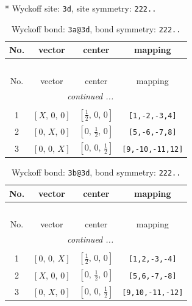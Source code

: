 \documentclass[fleqn,8pt]{jsarticle}
\begin{document}
* Wyckoff site: {\tt 3d}, site symmetry: {\tt 222..}
\renewcommand{\arraystretch}{1.2}
\begin{longtable}{cccc}
\caption{Wyckoff bond: {\tt 3a@3d}, bond symmetry: {\tt 222..}}
 \\
 \hline \hline
No. & vector & center & mapping \\ \hline \endfirsthead

\multicolumn{3}{l}{\tablename\ \thetable{}} \\
 \hline \hline
No. & vector & center & mapping \\ \hline \endhead

 \hline \hline
\multicolumn{3}{r}{\footnotesize\it continued ...} \\ \endfoot

 \hline \hline
\multicolumn{3}{r}{} \\ \endlastfoot

1 & $\left[ X,\, 0,\, 0 \right]$ & $\left[ \frac{1}{2},\, 0,\, 0 \right]$ & {\tt [1,-2,-3,4]} \\ \hline
2 & $\left[ 0,\, X,\, 0 \right]$ & $\left[ 0,\, \frac{1}{2},\, 0 \right]$ & {\tt [5,-6,-7,8]} \\ \hline
3 & $\left[ 0,\, 0,\, X \right]$ & $\left[ 0,\, 0,\, \frac{1}{2} \right]$ & {\tt [9,-10,-11,12]} \\
\end{longtable}
\renewcommand{\arraystretch}{1.2}
\begin{longtable}{cccc}
\caption{Wyckoff bond: {\tt 3b@3d}, bond symmetry: {\tt 222..}}
 \\
 \hline \hline
No. & vector & center & mapping \\ \hline \endfirsthead

\multicolumn{3}{l}{\tablename\ \thetable{}} \\
 \hline \hline
No. & vector & center & mapping \\ \hline \endhead

 \hline \hline
\multicolumn{3}{r}{\footnotesize\it continued ...} \\ \endfoot

 \hline \hline
\multicolumn{3}{r}{} \\ \endlastfoot

1 & $\left[ 0,\, 0,\, X \right]$ & $\left[ \frac{1}{2},\, 0,\, 0 \right]$ & {\tt [1,2,-3,-4]} \\ \hline
2 & $\left[ X,\, 0,\, 0 \right]$ & $\left[ 0,\, \frac{1}{2},\, 0 \right]$ & {\tt [5,6,-7,-8]} \\ \hline
3 & $\left[ 0,\, X,\, 0 \right]$ & $\left[ 0,\, 0,\, \frac{1}{2} \right]$ & {\tt [9,10,-11,-12]} \\
\end{longtable}
\end{document}
